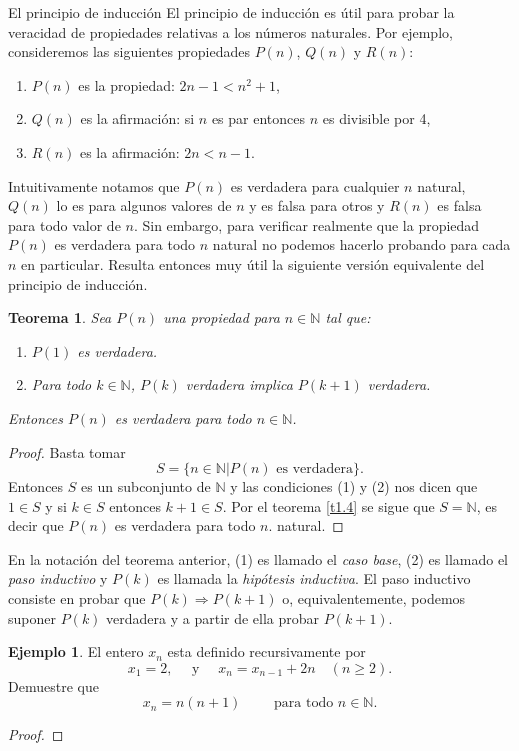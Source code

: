 \documentclass[11pt,spanish,makeidx]{amsbook}
\newtheorem{teorema}{Teorema}[section]
\theoremstyle{definition}
\newtheorem{ejemplo}{Ejemplo}[section]
\theoremstyle{remark}
\begin{document}
\begin{section}{El principio de inducción}
El principio de inducción es útil para probar la veracidad de propiedades relativas a los números naturales. Por ejemplo, consideremos las siguientes propiedades $P(n)$, $Q(n)$ y $R(n)$:
\begin{enumerate}
\item $P(n)$ es la propiedad: $2n -1 < n^2 + 1$,
\item $Q(n)$ es la afirmación: si $n$ es par entonces $n$ es divisible por 4,
\item $R(n)$ es la afirmación: $2n < n- 1$.
\end{enumerate}
Intuitivamente notamos que $P(n)$ es verdadera para cualquier $n$ natural, $Q(n)$ lo es para algunos valores de $n$ y es falsa para otros y $R(n)$ es falsa para todo valor de $n$. Sin embargo, para verificar realmente que la propiedad $P(n)$ es verdadera para todo $n$ natural no podemos hacerlo probando para cada $n$ en particular. Resulta entonces muy útil la siguiente versión equivalente del principio de inducción.
\begin{teorema}\label{induccion2} Sea $P(n)$ una propiedad para $n \in \mathbb N$ tal que:
\begin{enumerate}
\item[(1)] $P(1)$ es verdadera.
\item[(2)] Para todo $k \in \mathbb N$, $P(k)$ verdadera implica $P(k + 1)$ verdadera.
\end{enumerate}
Entonces $P(n)$ es verdadera para todo $n \in \mathbb N$.
\end{teorema}
\begin{proof} Basta tomar
$$S = \{n \in \mathbb N| P(n) \text{ es verdadera} \}.$$
Entonces $S$ es un subconjunto de $\mathbb N$ y las condiciones (1) y (2) nos dicen que $1 \in S$ y  si $ k \in S$ entonces $k+1\in S$. Por el teorema \ref{t1.4} se sigue que $S= \mathbb N$, es decir que $P(n)$ es verdadera para todo $n$. natural.
\end{proof}

En la notación del teorema anterior, (1) es llamado  el {\em caso base}, (2) es llamado el  {\em paso inductivo} y $P(k)$ es llamada la {\em hipótesis inductiva}. El paso inductivo  consiste en probar que $P(k) \Rightarrow P(k + 1)$ o, equivalentemente, podemos suponer $P(k)$ verdadera y a partir de ella probar $P(k + 1)$. 


\begin{ejemplo} El entero $x_n$ esta definido recursivamente por
$$
x_1=2, \quad \text{ y } \quad x_n=x_{n-1} +2n \quad (n\ge 2).
$$
Demuestre que
$$
x_n = n(n+1) \qquad \text{ para todo } n\in \mathbb N.
$$
\end{ejemplo}
\begin{proof}


\end{proof}
\end{section}
\end{document}

